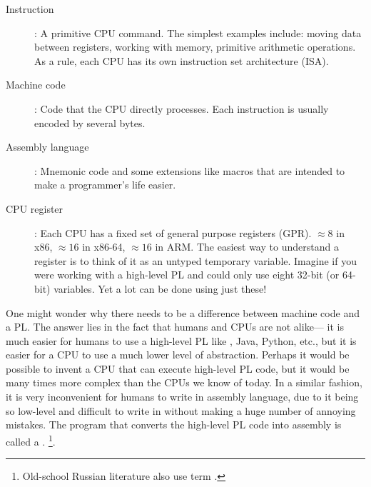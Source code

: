 \begin{description}
\item[Instruction]: A primitive \ac{CPU} command.
The simplest examples include: moving data between registers, working with memory, primitive arithmetic operations.
As a rule, each \ac{CPU} has its own instruction set architecture (\ac{ISA}).

\item[Machine code]: Code that the \ac{CPU} directly processes. 
Each instruction is usually encoded by several bytes.
\item[Assembly language]: Mnemonic code and some extensions like macros that are intended to make a programmer's life easier.
\item[CPU register]: Each \ac{CPU} has a fixed set of general purpose registers (\ac{GPR}).
$\approx 8$ in x86, $\approx 16$ in x86-64, $\approx 16$ in ARM.
The easiest way to understand a register is to think of it as an untyped temporary variable.
Imagine if you were working with a high-level \ac{PL} and could only use eight 32-bit (or 64-bit) variables.
Yet a lot can be done using just these!
\end{description}


One might wonder why there needs to be a difference between machine code and a \ac{PL}.  The answer lies in the fact that humans and \ac{CPU}s are not alike---%
it is much easier for humans to use a high-level \ac{PL} like \CCpp, Java, Python, etc., but it is easier for a \ac{CPU} to use a much lower level of abstraction.
Perhaps it would be possible to invent a \ac{CPU} that can execute high-level \ac{PL} code, but it would be many times more complex than the \ac{CPU}s we know of today.
In a similar fashion, it is very inconvenient for humans to write in assembly language, due to it being so low-level and difficult to write in without making a huge number of annoying mistakes.
The program that converts the high-level \ac{PL} code into assembly is called a .
\footnote{Old-school Russian literature also use term .}.

\ifx\LITE\undefined
{}%
%
%

